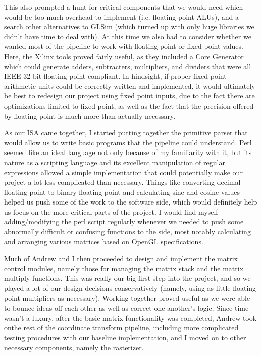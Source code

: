\documentclass[letterpaper,10pt]{article}
\begin{document}
This also prompted a hunt for critical components that we would need which would be too much overhead to implement (i.e. floating point ALUs), and a search other alternatives to GLSim (which turned up with only huge libraries we didn't have time to deal with). At this time we also had to consider whether we wanted most of the pipeline to work with floating point or fixed point values. Here, the Xilinx tools proved fairly useful, as they included a Core Generator which could generate adders, subtracters, multipliers, and dividers that were all IEEE 32-bit floating point compliant. In hindsight, if proper fixed point arithmetic units could be correctly written and implemented, it would ultimately be best to redesign our project using fixed point inputs, due to the fact there are optimizations limited to fixed point, as well as the fact that the precision offered by floating point is much more than actually necessary.

As our ISA came together, I started putting together the primitive parser that would allow us to write basic programs that the pipeline could understand. Perl seemed like an ideal language not only because of my familiarity with it, but its nature as a scripting language and its excellent manipulation of regular expressions allowed a simple implementation that could potentially make our project a lot less complicated than necessary. Things like converting decimal floating point to binary floating point and calculating sine and cosine values helped us push some of the work to the software side, which would definitely help us focus on the more critical parts of the project. I would find myself adding/modifying the perl script regularly whenever we needed to push some abnormally difficult or confusing functions to the side, most notably calculating and arranging various matrices based on OpenGL specifications.

Much of  Andrew and I then proceeded to design and implement the matrix control modules, namely those for managing the matrix stack and the matrix multiply functions. This was really our big first step into the project, and so we played a lot of our design decisions conservatively (namely, using as little floating point multipliers as necessary). Working together proved useful as we were able to bounce ideas off each other as well as correct one another's logic. Since time wasn't a luxury, after the basic matrix functionality was completed, Andrew took onthe rest of the coordinate transform pipeline, including more complicated testing procedures with our baseline implementation, and I moved on to other necessary components, namely the rasterizer.
\end{document}
